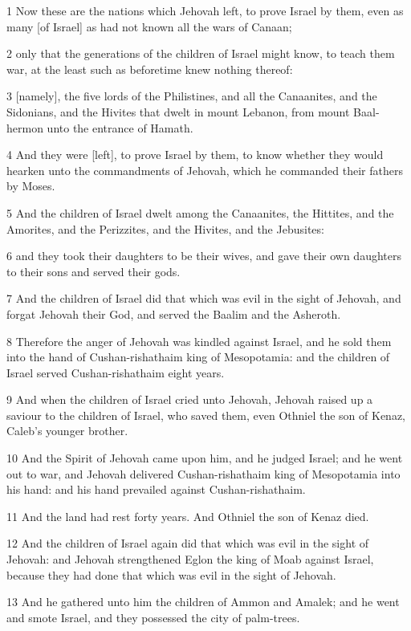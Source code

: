 \par 1 Now these are the nations which Jehovah left, to prove Israel by them, even as many [of Israel] as had not known all the wars of Canaan;
\par 2 only that the generations of the children of Israel might know, to teach them war, at the least such as beforetime knew nothing thereof:
\par 3 [namely], the five lords of the Philistines, and all the Canaanites, and the Sidonians, and the Hivites that dwelt in mount Lebanon, from mount Baal-hermon unto the entrance of Hamath.
\par 4 And they were [left], to prove Israel by them, to know whether they would hearken unto the commandments of Jehovah, which he commanded their fathers by Moses.
\par 5 And the children of Israel dwelt among the Canaanites, the Hittites, and the Amorites, and the Perizzites, and the Hivites, and the Jebusites:
\par 6 and they took their daughters to be their wives, and gave their own daughters to their sons and served their gods.
\par 7 And the children of Israel did that which was evil in the sight of Jehovah, and forgat Jehovah their God, and served the Baalim and the Asheroth.
\par 8 Therefore the anger of Jehovah was kindled against Israel, and he sold them into the hand of Cushan-rishathaim king of Mesopotamia: and the children of Israel served Cushan-rishathaim eight years.
\par 9 And when the children of Israel cried unto Jehovah, Jehovah raised up a saviour to the children of Israel, who saved them, even Othniel the son of Kenaz, Caleb's younger brother.
\par 10 And the Spirit of Jehovah came upon him, and he judged Israel; and he went out to war, and Jehovah delivered Cushan-rishathaim king of Mesopotamia into his hand: and his hand prevailed against Cushan-rishathaim.
\par 11 And the land had rest forty years. And Othniel the son of Kenaz died.
\par 12 And the children of Israel again did that which was evil in the sight of Jehovah: and Jehovah strengthened Eglon the king of Moab against Israel, because they had done that which was evil in the sight of Jehovah.
\par 13 And he gathered unto him the children of Ammon and Amalek; and he went and smote Israel, and they possessed the city of palm-trees.
